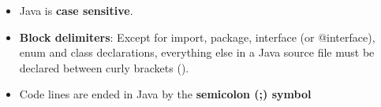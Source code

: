 
\begin{flushleft}
	
	\begin{itemize}
		
		\item Java is \textbf{case sensitive}.
		\item \textbf{Block delimiters}: Except for import, package, interface (or @interface), enum and class declarations, everything else in a Java source file must be declared between curly brackets ({}).
		\item Code lines are ended in Java by the \textbf{semicolon (;) symbol}

	\end{itemize}	
	
	
\end{flushleft}

